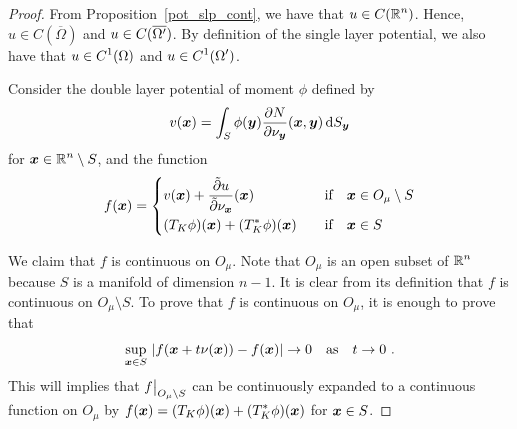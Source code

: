 \begin{proof}
From Proposition~\ref{pot_slp_cont}, we have that
$\displaystyle u \in C(\mathbb{R}^n)$.
Hence, $u \in C(\overline{\Omega})$ and
$\displaystyle u \in C(\overline{\Omega^{\prime}})$.  By definition of
the single layer potential, we also have that
$\displaystyle u \in C^1(\Omega)$ and
$\displaystyle u \in C^1(\Omega^{\prime})$.

Consider the double layer potential of moment $\phi$ defined by
\[
v({\bm{x}}) = \int_S \phi({\bm{y}})
\frac{\partial{N}}{\partial \nu_{{\bm{y}}}}({\bm{x}},{\bm{y}}) \,\mathrm{d}{S}_{{\bm{y}}}
\]
for $\displaystyle {\bm{x}} \in \mathbb{R}^n \setminus S$, and the function
\[
f({\bm{x}}) =
\begin{cases}
\displaystyle v({\bm{x}}) + \frac{\tilde{\partial}{u}}{\tilde{\partial}{\nu_{{\bm{x}}}}}({\bm{x}}) & \quad
\text{if} \quad {\bm{x}} \in O_\mu \setminus S \\[0.7em]
\displaystyle
(T_K\phi)({\bm{x}}) + (T^\ast_K\phi)({\bm{x}}) & \quad \text{if} \quad
{\bm{x}} \in S
\end{cases}
\]

 We claim that $f$ is continuous on $O_\mu$.  Note that
$O_\mu$ is an open subset of $\displaystyle \mathbb{R}^n$ because $S$ is a manifold of
dimension $n-1$.  It is clear
from its definition that $f$ is continuous on $O_\mu \setminus S$.
To prove that $f$ is continuous on $O_\mu$, it is enough to prove that
\[
\sup_{{\bm{x}}\in S}\,
\left| f({\bm{x}}+t\nu({\bm{x}})) - f({\bm{x}})\right| \rightarrow
0 \quad \text{as} \quad t \rightarrow 0 \ .
\]
This will implies that
$\displaystyle f\big|_{O_\mu \setminus S}$ can be
continuously expanded to a continuous function on $O_\mu$ by
$\displaystyle f({\bm{x}}) = (T_K\phi)({\bm{x}}) + (T^\ast_K\phi)({\bm{x}})$
for ${\bm{x}} \in S$.


\end{proof}
